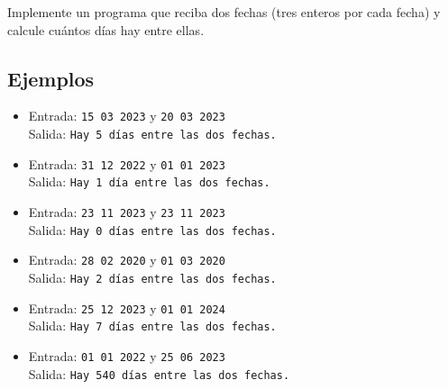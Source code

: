 Implemente un programa que reciba dos fechas (tres enteros por cada fecha) y calcule cuántos días hay entre ellas.
\subsection*{Ejemplos}
\begin{itemize}
    \item Entrada: \texttt{15 03 2023} y \texttt{20 03 2023}\\
          Salida: \texttt{Hay 5 días entre las dos fechas.}
    \item Entrada: \texttt{31 12 2022} y \texttt{01 01 2023}\\
          Salida: \texttt{Hay 1 día entre las dos fechas.}
    \item Entrada: \texttt{23 11 2023} y \texttt{23 11 2023}\\
          Salida: \texttt{Hay 0 días entre las dos fechas.}
    \item Entrada: \texttt{28 02 2020} y \texttt{01 03 2020}\\
          Salida: \texttt{Hay 2 días entre las dos fechas.}
    \item Entrada: \texttt{25 12 2023} y \texttt{01 01 2024}\\
          Salida: \texttt{Hay 7 días entre las dos fechas.}
    \item Entrada: \texttt{01 01 2022} y \texttt{25 06 2023}\\
          Salida: \texttt{Hay 540 días entre las dos fechas.}
\end{itemize}
